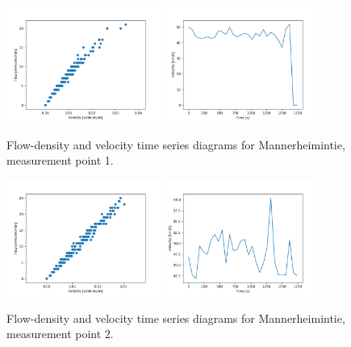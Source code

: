 \documentclass[english, 12pt, a4paper, elec, utf8, pdfa, online]{aaltothesis}
\begin{document}
\clearpage
\begin{figure}[ht!]
    \centering
    \includegraphics[width=0.45\textwidth]{graphs/Mannerheimintie_1_flw_dns.png}
    \includegraphics[width=0.45\textwidth]{graphs/Mannerheimintie_1_spd_time_6.png}
    \caption{Flow-density and velocity time series diagrams for Mannerheimintie, measurement point 1.}
\end{figure}
\begin{figure}[ht!]
    \centering
    \includegraphics[width=0.45\textwidth]{graphs/Mannerheimintie_2_flw_dns.png}
    \includegraphics[width=0.45\textwidth]{graphs/Mannerheimintie_2_spd_time_6.png}
    \caption{Flow-density and velocity time series diagrams for Mannerheimintie, measurement point 2.}
\end{figure}
\end{document}
